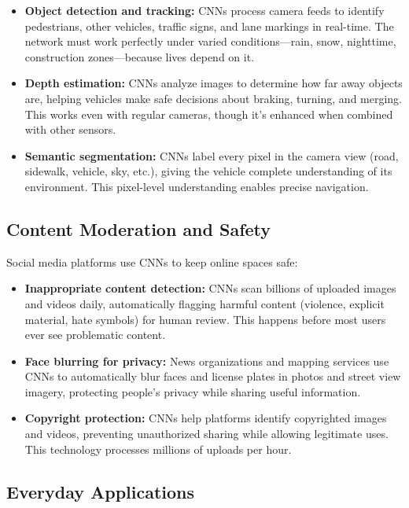 \begin{itemize}
    \item \textbf{Object detection and tracking:} CNNs process camera feeds to identify pedestrians, other vehicles, traffic signs, and lane markings in real-time. The network must work perfectly under varied conditions—rain, snow, nighttime, construction zones—because lives depend on it.
    
    \item \textbf{Depth estimation:} CNNs analyze images to determine how far away objects are, helping vehicles make safe decisions about braking, turning, and merging. This works even with regular cameras, though it's enhanced when combined with other sensors.
    
    \item \textbf{Semantic segmentation:} CNNs label every pixel in the camera view (road, sidewalk, vehicle, sky, etc.), giving the vehicle complete understanding of its environment. This pixel-level understanding enables precise navigation.
\end{itemize}

\subsection{Content Moderation and Safety}

Social media platforms use CNNs to keep online spaces safe:

\begin{itemize}
    \item \textbf{Inappropriate content detection:} CNNs scan billions of uploaded images and videos daily, automatically flagging harmful content (violence, explicit material, hate symbols) for human review. This happens before most users ever see problematic content.
    
    \item \textbf{Face blurring for privacy:} News organizations and mapping services use CNNs to automatically blur faces and license plates in photos and street view imagery, protecting people's privacy while sharing useful information.
    
    \item \textbf{Copyright protection:} CNNs help platforms identify copyrighted images and videos, preventing unauthorized sharing while allowing legitimate uses. This technology processes millions of uploads per hour.
\end{itemize}

\subsection{Everyday Applications}

